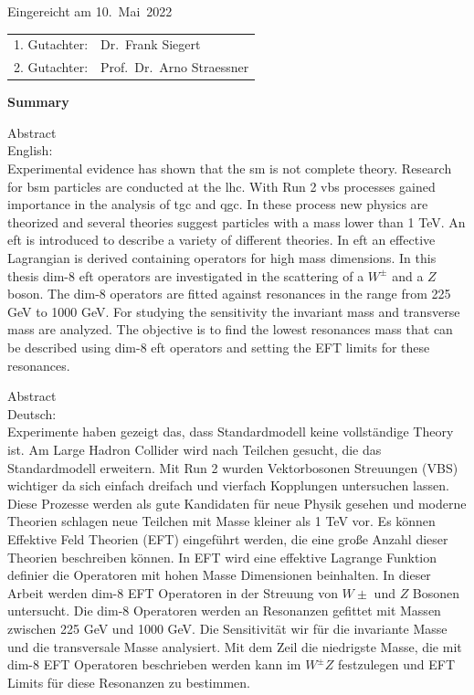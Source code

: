 \thispagestyle{empty}\vspace*{48em}

Eingereicht am 10.~Mai~2022\vspace{1.5em}
\par{\large\begin{tabular}{ll}
        1. Gutachter: & Dr.~Frank Siegert         \\
        2. Gutachter: & Prof.~Dr.~Arno Straessner \\
    \end{tabular}}


\newpage
\begin{center}\large\bfseries Summary\end{center}


Abstract \\
English: \\
Experimental evidence has shown that the \acrfull{sm} is not complete theory.
Research for \acrfull{bsm} particles are conducted at the \acrfull{lhc}. With Run 2 \acrfull{vbs} processes gained importance in the analysis of \acrfull{tgc} and \acrfull{qgc}.
In these process new physics are theorized and several theories suggest particles with a mass lower than 1 TeV.
An \acrfull{eft} is introduced to describe a variety of different theories. In \acrshort{eft} an effective Lagrangian is derived containing operators for high mass dimensions.
In this thesis dim-8 \acrshort{eft} operators are investigated in the scattering of a $W^{\pm}$ and a $Z$ boson. The dim-8 operators are fitted against resonances in the range from 225 GeV to 1000 GeV.
For studying the sensitivity the invariant mass and transverse mass are analyzed. The objective is to find the lowest resonances mass that can be described using dim-8 \acrshort{eft} operators and setting the EFT limits for these resonances.


\vspace{10em}
Abstract \\
Deutsch: \\
Experimente haben gezeigt das, dass Standardmodell keine vollständige Theory ist.
Am Large Hadron Collider wird nach Teilchen gesucht, die das Standardmodell erweitern.
Mit Run 2 wurden Vektorbosonen Streuungen (VBS) wichtiger da sich einfach dreifach und vierfach Kopplungen untersuchen lassen.
Diese Prozesse werden als gute Kandidaten für neue Physik gesehen und moderne Theorien schlagen neue Teilchen mit Masse kleiner als 1 TeV vor.
Es können Effektive Feld Theorien (EFT) eingeführt werden, die eine große Anzahl dieser Theorien beschreiben können.
In EFT wird eine effektive Lagrange Funktion definier die Operatoren mit hohen Masse Dimensionen beinhalten.
In dieser Arbeit werden dim-8 EFT Operatoren in der Streuung von $W{\pm}$ und $Z$ Bosonen untersucht. Die dim-8 Operatoren werden an Resonanzen gefittet mit Massen zwischen 225 GeV und 1000 GeV.
Die Sensitivität wir für die invariante Masse und die transversale Masse analysiert. Mit dem Zeil die niedrigste Masse,
die mit dim-8 EFT Operatoren beschrieben werden kann im $W^{\pm}Z$ festzulegen und EFT Limits für diese Resonanzen zu bestimmen.



